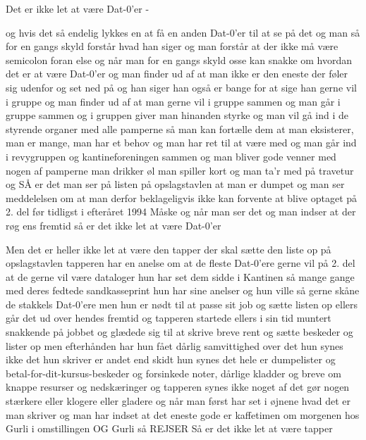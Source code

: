\documentclass[a4paper,11pt]{article}
\begin{document}
\begin{sketch}
         Det er ikke let at være Dat-0'er -

         og hvis det så endelig lykkes en at få en anden Dat-0'er
                til at se på det og man så for en gangs skyld
                forstår hvad han siger og man
                forstår at der ikke må være semicolon foran else
         og når man for en gangs skyld osse kan snakke om hvordan det
                er at være Dat-0'er
         og man finder ud af at man ikke er den eneste der føler sig
                udenfor og set ned på og han siger han også er
                bange for at sige han gerne vil i gruppe
         og man finder ud af at man gerne vil i gruppe sammen
                og man går i gruppe sammen
                og i gruppen giver man hinanden styrke
         og man vil gå ind i de styrende organer med alle
                pamperne så man kan fortælle dem at man
                eksisterer, man er mange, man har et
                behov og man har ret til at være med
         og man går ind i revygruppen og kantineforeningen
                sammen
         og man bliver gode venner med nogen af pamperne
                man drikker øl
                man spiller kort
                og man ta'r med på travetur
         og SÅ er det man ser på listen på opslagstavlen
                at man er dumpet og man
                ser meddelelsen om at man derfor
                beklageligvis ikke kan forvente at blive
                optaget på 2. del før tidligst i efteråret 1994
                Måske
         og når man ser det og man
                indser at der røg ens fremtid
         så er det ikke let at være Dat-0'er

         Men det er heller ikke let at være den tapper der skal sætte
                den liste op på opslagstavlen
         tapperen har en anelse om at de fleste Dat-0'ere
                gerne vil på 2. del at de gerne vil være dataloger
         hun har set dem sidde i Kantinen så mange gange med deres
                fedtede sandkasseprint
         hun har sine anelser og hun ville så
                gerne skåne de stakkels Dat-0'ere
         men hun er nødt til at passe sit job
                og sætte listen op
         ellers går det ud over hendes fremtid
         og tapperen startede ellers i sin tid muntert snakkende
                på jobbet og
                glædede sig til at skrive breve rent
                og sætte beskeder og lister op
         men efterhånden har hun fået dårlig samvittighed over det
         hun synes ikke det hun skriver er andet end skidt
         hun synes det hele er
                dumpelister og betal-for-dit-kursus-beskeder
                og forsinkede noter, dårlige kladder og breve
                om knappe resurser og nedskæringer
         og tapperen synes ikke noget af det
                gør nogen stærkere eller klogere eller gladere
         og når man først har set i øjnene hvad det er man skriver
         og man har indset at det eneste gode
                er kaffetimen om morgenen
                hos Gurli i omstillingen
         OG Gurli så REJSER
         Så er det ikke let at være tapper


\end{sketch}
\end{document}
